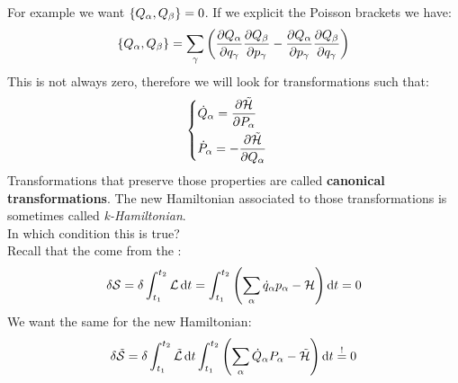 For example we want $\pb{Q_{\alpha}}{Q_{\beta}} = 0$. If we explicit the Poisson brackets we have:
\begin{equation}
    \pb{Q_{\alpha}}{Q_{\beta}} = \bigsum_{\gamma} \left(\pdv{Q_{\alpha}}{q_{\gamma}} \pdv{Q_{\beta}}{p_{\gamma}} - \pdv{Q_{\alpha}}{p_{\gamma}} \pdv{Q_{\beta}}{q_{\gamma}} \right)
\end{equation}
This is not always zero, therefore we will look for transformations such that:
\begin{equation}
    \begin{cases}
        \dot{Q}_{\alpha} = \pdv{\tilde{\hamfun}}{P_{\alpha}} \\[8pt]
        \dot{P}_{\alpha} = -\pdv{\tilde{\hamfun}}{Q_{\alpha}}
    \end{cases}
\end{equation}
Transformations that preserve those properties are called \textbf{canonical transformations}. The new Hamiltonian associated to those transformations is sometimes called \textit{k-Hamiltonian}.\\
In which condition this is true?\\
Recall that the \hamiltonref\;come from the \hpquotemath :
\begin{equation}
    \delta \mathcal{S} = \delta \int_{t_1}^{t_2}\mathcal{L} \dd{t} = \int_{t_1}^{t_2} \left(\displaystyle\sum_{\alpha}\dot{q}_{\alpha}p_{\alpha} - \mathcal{H}\right) \dd{t} =0
\end{equation}
We want the same for the new Hamiltonian:
\begin{equation}
    \delta \tilde{\mathcal{S}} = \delta \int_{t_1}^{t_2}\tilde{\mathcal{L}} \dd{t} \int_{t_1}^{t_2} \left(\displaystyle\sum_{\alpha}\dot{Q}_{\alpha}P_{\alpha} - \tilde{\mathcal{H}}\right) \dd{t} \overset{!}{=} 0
\end{equation}
